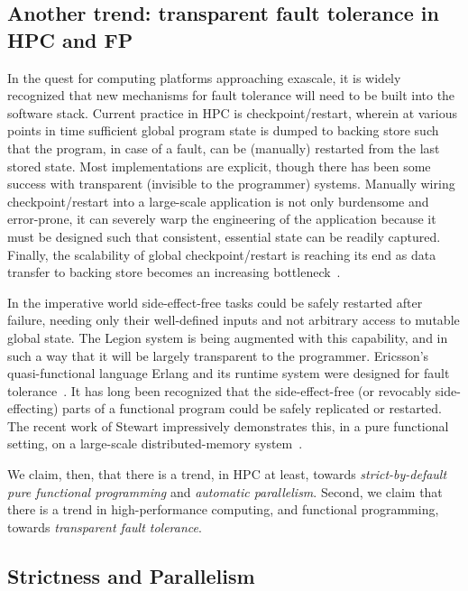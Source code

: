 \documentclass{llncs}
\begin{document}
\subsection{Another trend: transparent fault tolerance in HPC and FP}
In the quest for computing platforms approaching exascale, it is widely
recognized that new mechanisms for fault tolerance will need to be built into
the software stack.  Current practice in HPC is checkpoint/restart, wherein at
various points in time sufficient global program state is dumped to backing store
such that the program, in case of a fault, can be (manually) restarted from
the last stored state.  Most implementations are explicit, though there has
been some success with transparent (invisible to the programmer) systems.
Manually wiring checkpoint/restart into a large-scale application is not only
burdensome and error-prone, it can severely warp the engineering of the
application because it must be designed such that consistent, essential state
can be readily captured.  Finally, the scalability of global
checkpoint/restart is reaching its end as data transfer to backing store
becomes an increasing bottleneck~\cite{Daly:2006,DOE:2009}.

In the imperative world side-effect-free tasks could be safely restarted after
failure, needing only their well-defined inputs and not arbitrary access to
mutable global state.  The Legion system is being augmented with this
capability, and in such a way that it will be largely transparent to the
programmer.  Ericsson's quasi-functional language Erlang and its runtime
system were designed for fault tolerance~\cite{Cesarini:2009}.  It has long
been recognized that the side-effect-free (or revocably side-effecting)
parts of a functional program could be safely replicated or restarted.  The
recent work of Stewart impressively demonstrates this, in a pure functional
setting, on a large-scale distributed-memory system~\cite{Stewart:2013}.

We claim, then, that there is a trend, in HPC at least, towards
\emph{strict-by-default pure functional programming} and \emph{automatic
parallelism}.
Second, we claim that there is a trend in high-performance computing, and
functional programming, towards \emph{transparent fault tolerance}.

\subsection{Strictness and Parallelism}
\end{document}
